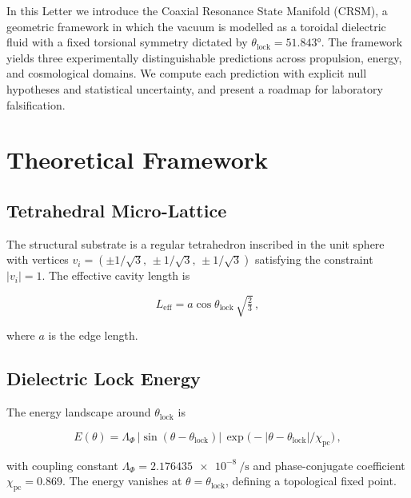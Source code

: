 \documentclass[twocolumn,aps,prl,superscriptaddress,showpacs]{revtex4-2}
\begin{document}
In this Letter we introduce the Coaxial Resonance State Manifold
(CRSM), a geometric framework in which the vacuum is modelled as a
toroidal dielectric fluid with a fixed torsional symmetry dictated
by $\theta_{\mathrm{lock}} = \ang{51.843}$.  The framework yields
three experimentally distinguishable predictions across propulsion,
energy, and cosmological domains.  We compute each prediction with
explicit null hypotheses and statistical uncertainty, and present a
roadmap for laboratory falsification.

\section{Theoretical Framework}
\label{sec:theory}

\subsection{Tetrahedral Micro-Lattice}

The structural substrate is a regular tetrahedron inscribed in the
unit sphere with vertices $v_i = (\pm 1/\sqrt{3},\, \pm 1/\sqrt{3},\,
\pm 1/\sqrt{3})$ satisfying the constraint
$\lvert v_i \rvert = 1$.  The effective cavity length is

\begin{equation}
L_{\mathrm{eff}} = a \cos\theta_{\mathrm{lock}}\,\sqrt{\tfrac{2}{3}}\,,
\label{eq:Leff}
\end{equation}

\noindent where $a$ is the edge length.

\subsection{Dielectric Lock Energy}

The energy landscape around $\theta_{\mathrm{lock}}$ is

\begin{equation}
E(\theta) = \Lambda_\Phi \,
\lvert\sin(\theta - \theta_{\mathrm{lock}})\rvert \,
\exp\!\bigl(-\lvert\theta - \theta_{\mathrm{lock}}\rvert / \chi_{\mathrm{pc}}\bigr)\,,
\label{eq:dielectric}
\end{equation}

\noindent with coupling constant
$\Lambda_\Phi = \SI{2.176435e-8}{\per\second}$ and phase-conjugate
coefficient $\chi_{\mathrm{pc}} = 0.869$.  The energy vanishes at
$\theta = \theta_{\mathrm{lock}}$, defining a topological fixed point.
\end{document}
